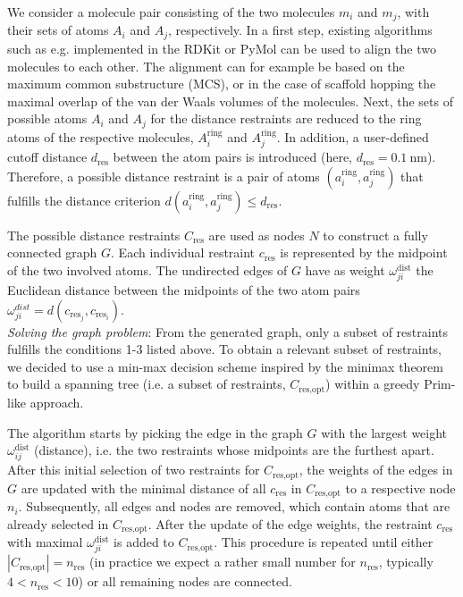 We consider a molecule pair consisting of the two molecules $m_i$ and $m_j$, with their sets of atoms $A_i$ and $A_j$, respectively. 
In a first step, existing algorithms such as e.g. implemented in the RDKit\cite{Landrum2021} or PyMol\cite{Delano2020} can be used to align the two molecules to each other. The alignment can for example be based on the maximum common substructure (MCS), or in the case of scaffold hopping the maximal overlap of the van der Waals volumes of the molecules.
Next, the sets of possible atoms $A_i$ and $A_j$ for the distance restraints are reduced to the ring atoms of the respective molecules, $A^\text{ring}_i$ and $A^\text{ring}_j$. 
In addition, a user-defined cutoff distance $d_\text{res}$ between the atom pairs is introduced (here, $d_\text{res} = 0.1~\text{nm}$). 
Therefore, a possible distance restraint is a pair of atoms $(a^\text{ring}_i, a^\text{ring}_j)$ that fulfills the distance criterion $d(a^\text{ring}_i, a^\text{ring}_j) \leq d_\text{res}$.

The possible distance restraints $C_\text{res}$ are used as nodes $N$ to construct a fully connected graph $G$. 
Each individual restraint $c_\text{res}$ is represented by the midpoint of the two involved atoms.
The undirected edges of $G$ have as weight $\omega^\text{dist}_{ji}$ the Euclidean distance between the midpoints of the two atom pairs $\omega^{dist}_{ji}=d(c_{\text{res}_j},c_{\text{res}_i})$. \\

\noindent\textit{Solving the graph problem}:
From the generated graph, only a subset of restraints fulfills the conditions 1-3 listed above. To obtain a relevant subset of restraints, we decided to use a min-max decision scheme inspired by the minimax theorem \cite{Neumann1928} to build a spanning tree (i.e. a subset of restraints, $C_\text{res,opt}$) within a greedy Prim-like approach.\cite{Prim1957}

The algorithm starts by picking the edge in the graph $G$ with the largest weight $\omega^\text{dist}_{ij}$ (distance), i.e. the two restraints whose midpoints are the furthest apart. 
After this initial selection of two restraints for $C_\text{res,opt}$, the weights of the edges in $G$ are updated with the minimal distance of all $c_\text{res}$ in $C_\text{res,opt}$ to a respective node $n_i$. Subsequently, all edges and nodes are removed, which contain atoms that are already selected in $C_\text{res,opt}$.
After the update of the edge weights, the restraint $c_\text{res}$ with maximal $\omega^\text{dist}_{ji}$ is added to $C_\text{res,opt}$.
This procedure is repeated until either $|C_\text{res,opt}| = n_\text{res}$ (in practice we expect a rather small number for $n_\text{res}$, typically $ 4 < n_\text{res} < 10$) or all remaining nodes are connected. \\

